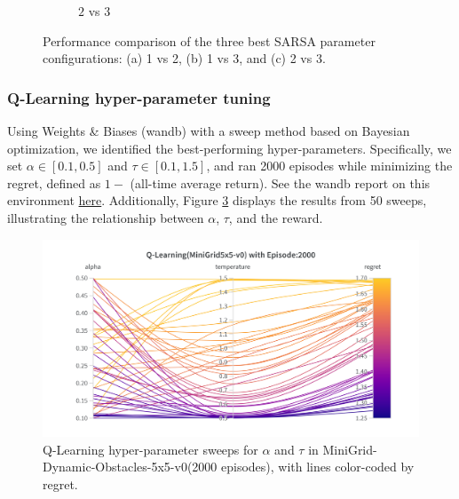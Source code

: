 \documentclass[11pt, a4]{article}
\begin{document}
\begin{figure}[H]
\begin{subfigure}{.7\textwidth}
						\caption{$2$ vs $3$}
						\label{fig:sarsaminigridworld2vs3}
					\end{subfigure}
					\caption{Performance comparison of the three best SARSA parameter configurations: (a) 1 vs 2, (b) 1 vs 3, and (c) 2 vs 3.}
					\label{fig:sarsaminigridworld}
				\end{figure}
			\subsubsection{Q-Learning hyper-parameter tuning}
			Using Weights \& Biases (wandb) with a sweep method based on Bayesian optimization, we identified the best-performing hyper-parameters. Specifically, we set $\alpha \in [0.1, 0.5]$ and $\tau \in [0.1, 1.5]$, and ran 2000 episodes while minimizing the regret, defined as \(1 -\) (all-time average return). See the wandb report on this environment \href{https://wandb.ai/ee24e009-iitm/minigrid-qlearning-softmax-tuning/reports/Q-Learning-MiniGrid-5x5-v0---VmlldzoxMjAyMTY4OQ?accessToken=7k22frexodx9vs7tryakvnme6ubxd011hcul9mke18nlhsfc8jtpo73poi45toq8}{here}. Additionally, Figure \ref{fig:qlearningminigridworld-regret} displays the results from 50 sweeps, illustrating the relationship between $\alpha$, $\tau$, and the reward.
			\begin{figure}[H]
				\centering
				\includegraphics[width=1\linewidth]{qlearning-hyp-tuning-minigridworld.png}
				\caption{Q-Learning hyper-parameter sweeps for $\alpha$ and $\tau$ in MiniGrid-Dynamic-Obstacles-5x5-v0(2000 episodes), with lines color-coded by regret.}
				\label{fig:qlearningminigridworld-regret}
			\end{figure}
\end{document}
